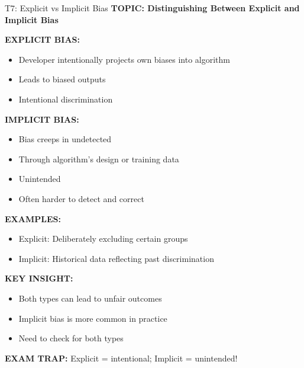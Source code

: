 \documentclass[8pt]{beamer}
\begin{document}
	\begin{frame}{T7: Explicit vs Implicit Bias}
		\fontsize{6.5}{7.5}\selectfont
		\textbf{TOPIC: Distinguishing Between Explicit and Implicit Bias}
		
		\vspace{0.1cm}
		\textbf{EXPLICIT BIAS:}
		\begin{itemize}
			\item Developer intentionally projects own biases into algorithm
			\item Leads to biased outputs
			\item Intentional discrimination
		\end{itemize}
		
		\vspace{0.1cm}
		\textbf{IMPLICIT BIAS:}
		\begin{itemize}
			\item Bias creeps in undetected
			\item Through algorithm's design or training data
			\item Unintended
			\item Often harder to detect and correct
		\end{itemize}
		
		\vspace{0.1cm}
		\textbf{EXAMPLES:}
		\begin{itemize}
			\item \textcolor{myblue}{Explicit:} Deliberately excluding certain groups
			\item \textcolor{myblue}{Implicit:} Historical data reflecting past discrimination
		\end{itemize}
		
		\vspace{0.1cm}
		\textbf{KEY INSIGHT:}
		\begin{itemize}
			\item Both types can lead to unfair outcomes
			\item Implicit bias is more common in practice
			\item Need to check for both types
		\end{itemize}
		
		\textcolor{myred}{\textbf{EXAM TRAP:}} Explicit = \textcolor{myblue}{intentional}; Implicit = \textcolor{myblue}{unintended}!
	\end{frame}
	
\end{document}
